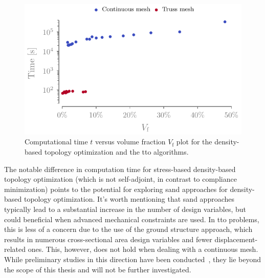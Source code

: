 \begin{figure}
    \centering
    \includegraphics{figures/03_comparison_TO_TTO/17_time_vol/time_vol.pdf}
    \caption{Computational time $t$ versus volume fraction $V_\text{f}$ plot for the density-based topology optimization and the \gls{tto} algorithms.}
    \label{fig:03_time_vol}
\end{figure}

The notable difference in computation time for stress-based density-based topology optimization (which is not self-adjoint, in contrast to compliance minimization) points to the potential for exploring \gls{sand} approaches for density-based topology optimization. It's worth mentioning that \gls{sand} approaches typically lead to a substantial increase in the number of design variables, but could beneficial when advanced mechanical constraints are used. In \gls{tto} problems, this is less of a concern due to the use of the ground structure approach, which results in numerous cross-sectional area design variables and fewer displacement-related ones. This, however, does not hold when dealing with a continuous mesh. While preliminary studies in this direction have been conducted~, they lie beyond the scope of this thesis and will not be further investigated. 


